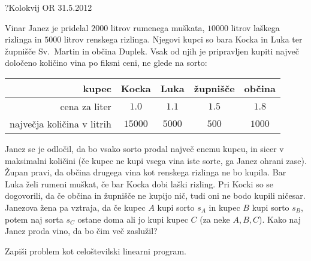 \begin{naloga}{?}{Kolokvij OR 31.5.2012}
\begin{vprasanje}
Vinar Janez je pridelal $2000$ litrov rumenega muškata,
$10000$ litrov laškega rizlinga in $5000$ litrov renskega rizlinga.
Njegovi kupci so bara Kocka in Luka ter župnišče Sv.~Martin in občina Duplek.
Vsak od njih je pripravljen kupiti največ določeno količino vina
po fiksni ceni, ne glede na sorto:

\begin{center}
\begin{tabular}{r|cccc}
kupec & Kocka & Luka & župnišče & občina \\ \hline
cena za liter & $1.0$ & $1.1$ & $1.5$ & $1.8$ \\
največja količina v litrih & $15000$ & $5000$ & $500$ & $1000$ \\
\end{tabular}
\end{center}

Janez se je odločil, da bo vsako sorto prodal največ enemu kupcu,
in sicer v maksimalni količini
(če kupec ne kupi vsega vina iste sorte, ga Janez ohrani zase).
Župan pravi, da občina drugega vina kot renskega rizlinga ne bo kupila.
Bar Luka želi rumeni muškat, če bar Kocka dobi laški rizling.
Pri Kocki so se dogovorili, da če občina in župnišče ne kupijo nič,
tudi oni ne bodo kupili ničesar.
Janezova žena pa vztraja,
da če kupec $A$ kupi sorto $s_A$ in kupec $B$ kupi sorto $s_B$,
potem naj sorta $s_C$ ostane doma ali jo kupi kupec $C$ (za neke $A, B, C$).
Kako naj Janez proda vino, da bo čim več zaslužil?

Zapiši problem kot celoštevilski linearni program.
\end{vprasanje}


\end{naloga}
